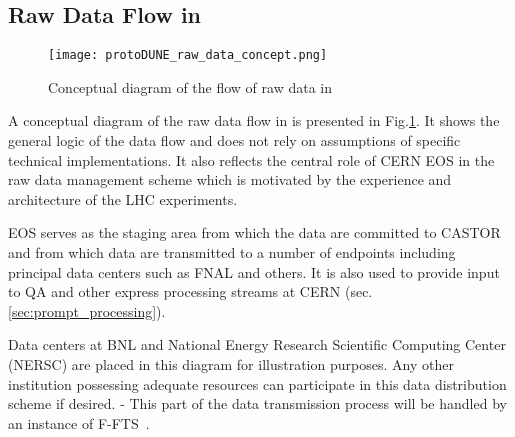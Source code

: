 \subsection{Raw Data Flow in \pd}
\label{sec:raw_concept}
\begin{figure}[tbh]
\centering\texttt{[image: protoDUNE\_raw\_data\_concept.png]}
\caption{\label{fig:raw_concept}Conceptual diagram of the flow of raw data in \pd}
\end{figure}

A conceptual diagram of the raw data flow in \pd is presented in Fig.\ref{fig:raw_concept}. It shows the general logic
of the data flow and does not rely on assumptions of specific technical implementations. 
It also reflects the central role of CERN EOS in the \pd raw data management scheme which is motivated by the experience
and architecture of the LHC experiments.

EOS serves as the staging area from which the data are committed to CASTOR
and from which data are transmitted to a number of endpoints including principal data centers such as FNAL and others.
It is also used to provide input to QA and other express processing streams at CERN (sec.\,\ref{sec:prompt_processing}).

Data centers at BNL and National Energy Research Scientific Computing Center (NERSC)
are placed in this diagram for illustration purposes. Any other institution possessing adequate
resources can participate in this data distribution scheme if desired.
-
 This part of the data transmission process will be handled by an instance of F-FTS~\cite{docdb1212}.



